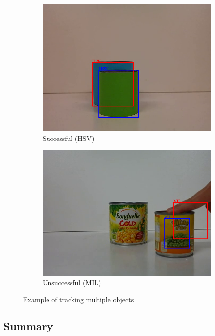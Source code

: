 \begin{figure}
\centering
\begin{subfigure}{0.48\linewidth}
\includegraphics[width=\linewidth]{img/experiments/color-occlusion.png}
\caption{Successful (HSV)}
\end{subfigure}
\begin{subfigure}{0.48\linewidth}
\includegraphics[width=\linewidth]{img/experiments/occlusion.png}
\caption{Unsuccessful (MIL)}
\end{subfigure}
\caption{Example of tracking multiple objects}
\label{fig:tracking-multiple}
\end{figure}

\subsection{Summary}

